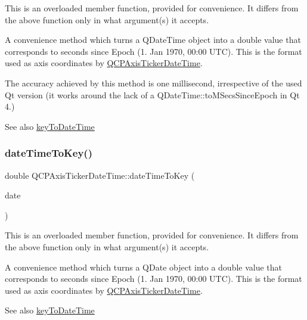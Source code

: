This is an overloaded member function, provided for convenience. It differs from the above function only in what argument(s) it accepts.

A convenience method which turns a Q\+Date\+Time object into a double value that corresponds to seconds since Epoch (1. Jan 1970, 00\+:00 U\+TC). This is the format used as axis coordinates by \hyperlink{class_q_c_p_axis_ticker_date_time}{Q\+C\+P\+Axis\+Ticker\+Date\+Time}.

The accuracy achieved by this method is one millisecond, irrespective of the used Qt version (it works around the lack of a Q\+Date\+Time\+::to\+M\+Secs\+Since\+Epoch in Qt 4.)

\begin{DoxySeeAlso}{See also}
\hyperlink{class_q_c_p_axis_ticker_date_time_a4c1761ad057f5564804a53f942629b53}{key\+To\+Date\+Time} 
\end{DoxySeeAlso}
\mbox{\label{class_q_c_p_axis_ticker_date_time_ad87afc7dba65843f68da5ca88bc004f4}} 
\subsubsection{\texorpdfstring{date\+Time\+To\+Key()}{dateTimeToKey()}\hspace{0.1cm}{\footnotesize\ttfamily [2/2]}}
{\footnotesize\ttfamily double Q\+C\+P\+Axis\+Ticker\+Date\+Time\+::date\+Time\+To\+Key (\begin{DoxyParamCaption}\item[{const Q\+Date}]{date }\end{DoxyParamCaption})\hspace{0.3cm}{\ttfamily [static]}}

This is an overloaded member function, provided for convenience. It differs from the above function only in what argument(s) it accepts.

A convenience method which turns a Q\+Date object into a double value that corresponds to seconds since Epoch (1. Jan 1970, 00\+:00 U\+TC). This is the format used as axis coordinates by \hyperlink{class_q_c_p_axis_ticker_date_time}{Q\+C\+P\+Axis\+Ticker\+Date\+Time}.

\begin{DoxySeeAlso}{See also}
\hyperlink{class_q_c_p_axis_ticker_date_time_a4c1761ad057f5564804a53f942629b53}{key\+To\+Date\+Time} 
\end{DoxySeeAlso}
\mbox{\label{class_q_c_p_axis_ticker_date_time_a78dece0d51426a3c310528d413e09193}} 
